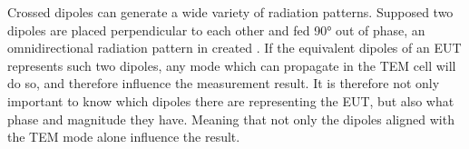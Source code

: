 Crossed dipoles can generate a wide variety of radiation patterns. Supposed two dipoles are placed perpendicular to each other and fed 90° out of phase, an omnidirectional radiation pattern in created \cite{7293591}. If the equivalent dipoles of an EUT represents such two dipoles, any mode which can propagate in the TEM cell will do so, and therefore influence the measurement result. It is therefore not only important to know which dipoles there are representing the EUT, but also what phase and magnitude they have. Meaning that not only the dipoles aligned with the TEM mode alone influence the result. 



